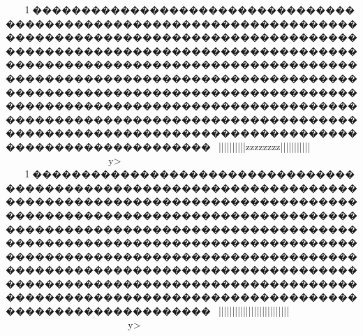 {{{{{{{{{{{{{{{{{{{{{{{{{{{{{{{{{{{{{{{{{{{{{{{{{{{{{{{{{{{{{{{{{{{{{{{{{{{{{{{{{{{{{{{{{{{{{{{{{{{{{{{{{{{{{{{{{{{{{{{{{{{{{{{{{{{{{{{{{{{{{{{{{{{{{{{{{{{{{{{{{{{{{{{{{{{{{{{{{{{{{{{{{{{{{{{{{{{{{{{{{{{{{{{{{{{{{{{{{{{{{{{{{{{{{{{{{{{{{{{{{{{{{{{{{{{{{{{{{{{{{{{{{{{{{{{{{{{{{{{{{{{{{{{{{{{{{{{{{{{{{{{{{{{{{{{{{{{{{{{{{{{{{{{{{{{{{{{{{{{{{{{{{{{{{{{{{{{{{{{{{{{{{{{{{{{{{{{{{{{{{{{{{{{{{{{{{{{{{{{{{{{{{{{{{{{{{{{{{{{{{{{{{{{{{{{{{{{{{{{{{{{{{{{{{{{{{{{{{{{{{{{{{{{{{{{{{{{{{{{{{{{{{{{{{{{{{{{{{{{{{{{{{{{{{{{{{{{{{{{{{{{{{{{{{{{{{{{{{{{{{{{{{{{{{{{{{{{{{{{{{{{{{{{{{{{{{{{{{{{{{{{{{{{{{{{{{{{{{{{{{{{{{{{{{{{{{{{{{{{{{{{{{{{{{{{{{{{{{{{{{{{{{{{{{{{{{{{{{{{{{{{{{{{{{{{{{{{{{{{{{{{{{{{{{{{{{{{{{{{{{{{{{{{{{{{{{{{{{{{{{{{{{{{{{{{{{{{{{{{{{{{{{{{{{{{{{{{{{{{{{{{{{{{{{{{{{{{{{{{{{{{{{{{{{{{{{{{{{{{{{{{{{{{{{{{{{{{{{{{{{{{{{{{{{{{{{{{{{{{{{{{{{{{{{{{{{{{{{{{{{{{{{{{{{{{{{{{{{{{{{{{{{{{{{{{{{{{{{{{{{{{{{{{{{{{{{{{{{{{{{{{{{{{{{{{{{{{{{{{{{{{{{{{{{{{{{{{{{{{{{{{{{{{{{{{{{{{{{{{{{{{{{{{{{{{{{{{{{{{{{{{{{{{{{{{{{{{1\ky������������������������������������������������������������������������������������������������������������������������������������������������������������������������������������������������������������������������������������������������������������������������������������������������������������������������������������������������������������������������������������������~}}||}}}}}||||||||{{{{{{{{zzzzzzzz{{}}}|||{{{{||||||||}}}}~~~~~~~~~~~~~~~~y>
1\ky������������������������������������������������������������������������������������������������������������������������������������������������������������������������������������������������������������������������������������������������������������������������������������������������������������������������������������������������������������������������������������������~}}||}}}}}||||||||{{{{{{{{{{{{{{{{||||||||||||||||}}}}~~~~~~~~~~~~~~~~~~~~y>
}}}}}}}}}}}}}}}}}}}}}}}}}}}}}}}}}}}}}}}}}}}}}}}}}}}}}}}}}}}}}}}}}}}}}}}}}}}}}}}}}}}}}}}}}}}}}}}}}}}}}}}}}}}}}}}}}}}}}}}}}}}}}}}}}}}}}}}}}}}}}}}}}}}}}}}}}}}}}}}}}}}}}}}}}}}}}}}}}}}}}}}}}}}}}}}}}}}}}}}}}}}}}}}}}}}}}}}}}}}}}}}}}}}}}}}}}}}}}}}}}}}}}}}}}}}}}}}}}}}}}}}}}}}}}}}}}}}}}}}}}}}}}}}}}}}}}}}}}}}}}}}}}}}}}}}}}}}}}}}}}}}}}}}}}}}}}}}}}}}}}}}}}}}}}}}}}}}}}}}}}}}}}}}}}}}}}}}}}}}}}}}}}}}}}}}}}}}}}}}}}}}}}}}}}}}}}}}}}}}}}}}}}}}}}}}}}}}}}}}}}}}}}}}}}}}}}}}}}}}}}}}}}}}}}}}}}}}}}}}}}}}}}}}}}}}}}}}}}}}}}}}}}}}}}}}}}}}}}}}}}}}}}}}}}}}}}}}}}}}}}}}}}}}}}}}}}}}}}}}}}}}}}}}}}}}}}}}}}}}}}}}}}}}}}}}}}}}}}}}}}}}}}}}}}}}}}}}}}}}}}}}}}}}}}}}}}}}}}}}}}}}}}}}}}}}}}}}}}}}}}}}}}}}}}}}}}}}}}}}}}}}}}}}}}}}}}}}}}}}}}}}}}}}}}}}}}}}}}}}}}}}}}}}}}}}}}}}}}}}}}}}}}}}}}}}}}}}}}}}}}}}}}}}}}}}}}}}}}}}}}}}}}}}}}}}}}}}}}}}}}}}}}}}}}}}}}}}}}}}}}}}}}}}}}}}}}}}}}}}}}}}}}}}}}}}}}}}}}}}}}}}}}}}}}}}}}}}}}}}}}}}}}}}}}}}}}}}}}}}}}}}}}}}}}}}}}}}}}}}}}}}}}}}}}}}}}}}}}}}}}}}}}}}}}}}}}}}}}}}}}}}}}}}}}}}}}}}}}}}}}}}}}}}}}}}}}}}}}}}}}}}}}}}}}}}}}}}}}}}}

